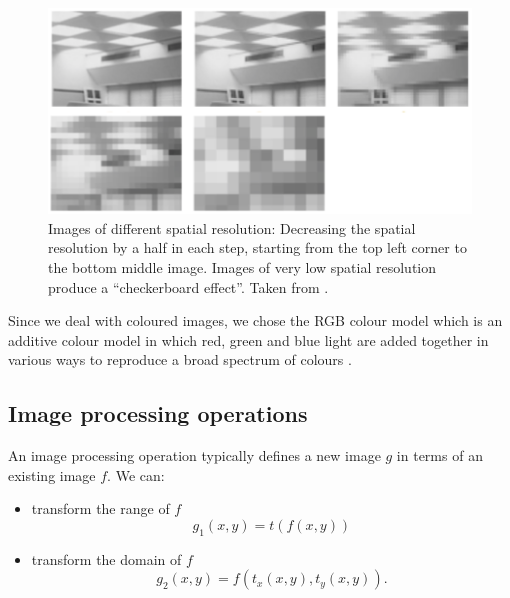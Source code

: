 \begin{figure}[H]
	\centering
	\includegraphics[width=\textwidth]{../Figures/checkerboard.png}
	\caption{Images of different spatial resolution: Decreasing the spatial resolution by a half in each step, starting from the top left corner to the bottom middle image. Images of very low spatial resolution produce a “checkerboard effect”.
	Taken from \cite{imagProcFundamentals}.}
	\label{fig:checkerboardEffect}
\end{figure}

%

Since we deal with coloured images, we chose the RGB colour model which is an additive colour model in which red, green and blue light are added together in various ways to reproduce a broad spectrum of colours \cite{ibraheem2012understanding}.


\subsection{Image processing operations}

An image processing operation typically defines a new image \( g \) in terms of an existing image \( f \).
We can: 
\begin{itemize}
	\item transform the range of \( f \)
	\[ 
	g_{1}(x, y) = t(f(x,y)) 
	\]
	\item transform the domain of \( f \)
	\[
	g_{2}(x,y) = f(t_{x}(x,y), t_{y}(x,y)).
	\]
\end{itemize}


